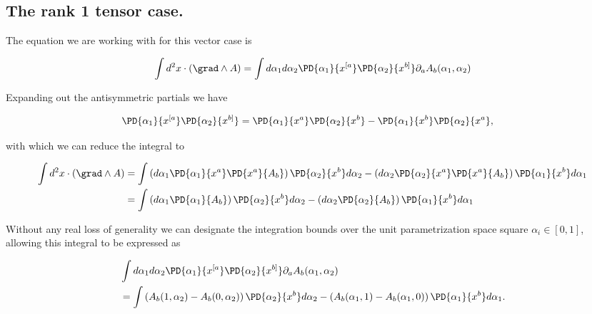 \subsection{The rank 1 tensor case.}

The equation we are working with for this vector case is

\begin{equation}\label{eqn:stokesTensor:430}
\int d^2 x \cdot (\grad \wedge A) =
\int
d{\alpha_1} d{\alpha_2}
\PD{\alpha_1}{x^{[a}}
\PD{\alpha_2}{x^{b]}}
\partial_a A_{b}(\alpha_1, \alpha_2)
\end{equation}

Expanding out the antisymmetric partials we have

\begin{align*}
\PD{\alpha_1}{x^{[a}}
\PD{\alpha_2}{x^{b]}}
&=
\PD{\alpha_1}{x^{a}}
\PD{\alpha_2}{x^{b}}
-
\PD{\alpha_1}{x^{b}}
\PD{\alpha_2}{x^{a}},
\end{align*}

with which we can reduce the integral to

\begin{align*}
\int d^2 x \cdot (\grad \wedge A)
&=
\int
\left( d{\alpha_1}
\PD{\alpha_1}{x^{a}}
\PD{x^a}{A_{b}} \right)
\PD{\alpha_2}{x^{b}} d{\alpha_2}
-
\left( d{\alpha_2}
\PD{\alpha_2}{x^{a}}
\PD{x^a}{A_{b}} \right)
\PD{\alpha_1}{x^{b}} d{\alpha_1} \\
&=
\int
\left( d\alpha_1 \PD{\alpha_1}{A_b} \right)
\PD{\alpha_2}{x^{b}} d{\alpha_2}
-
\left( d\alpha_2 \PD{\alpha_2}{A_b} \right)
\PD{\alpha_1}{x^{b}} d{\alpha_1} \\
\end{align*}

Without any real loss of generality we can designate the integration bounds over the unit parametrization space square $\alpha_i \in [0,1]$, allowing this integral to be expressed as

\begin{equation}\label{eqn:stokesTensor:450}
\begin{aligned}
&\int
d{\alpha_1} d{\alpha_2}
\PD{\alpha_1}{x^{[a}}
\PD{\alpha_2}{x^{b]}}
\partial_a A_{b}(\alpha_1, \alpha_2) \\
&=
\int
\left( A_b(1, \alpha_2) - A_b(0, \alpha_2) \right)
\PD{\alpha_2}{x^{b}} d{\alpha_2}
-
\left( A_b(\alpha_1, 1) - A_b(\alpha_1, 0) \right)
\PD{\alpha_1}{x^{b}} d{\alpha_1}.
\end{aligned}
\end{equation}

